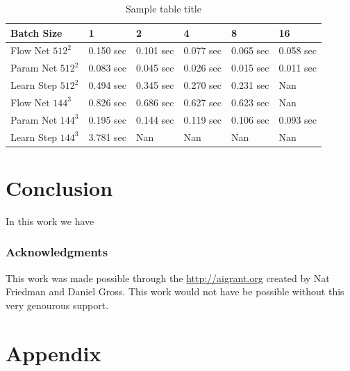 \documentclass{article} %
\begin{document}
\begin{table}[t]
\caption{Sample table title}
\label{computation_table}
\begin{center}
\begin{tabular}{l|lllll}
Batch Size & 1 & 2 & 4 & 8 & 16 \\ \hline 
Flow Net $512^2$ & 0.150 sec & 0.101 sec & 0.077 sec & 0.065 sec & 0.058 sec \\ 
Param Net $512^2$ & 0.083 sec & 0.045 sec & 0.026 sec & 0.015 sec & 0.011 sec \\ 
Learn Step $512^2$ & 0.494 sec & 0.345 sec & 0.270 sec & 0.231 sec & Nan \\ 
Flow Net $144^3$ & 0.826 sec & 0.686 sec & 0.627 sec & 0.623 sec & Nan \\ 
Param Net $144^3$ & 0.195 sec & 0.144 sec & 0.119 sec & 0.106 sec & 0.093 sec \\ 
Learn Step $144^3$ & 3.781 sec & Nan & Nan & Nan & Nan \\ 
\end{tabular}
\end{center}
\end{table}




\section{Conclusion}

In this work we have

\subsubsection*{Acknowledgments}

This work was made possible through the \url{http://aigrant.org} created by Nat Friedman and Daniel Gross. This work would not have be possible without this very genourous support.




\section{Appendix}
\end{document}
